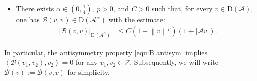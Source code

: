 \documentclass[11pt, reqno]{amsart}
\theoremstyle{definition}
\numberwithin{equation}{section}
\newcommand{\norm}[1]{\left\|{#1}\right\|}
\newcommand{\inpro}[2]{\left\langle#1,#2\right\rangle}
\newcommand{\abs}[1]{\left|{#1}\right|}
\begin{document}
\begin{itemize}
	\item[(B5)] There exists $\alpha\in (0,\frac14)$, $p>0$, and $C>0$ such that, for every $v\in \mathrm{D}(\mathcal{A})$, one has $\mathcal{B}(v,v)\in \mathrm{D}(\mathcal{A}^\alpha)$ with the estimate:
	\begin{align}
		\label{equ:V norm B}
		\abs{\mathcal{B}(v,v)}_{\mathrm{D}(\mathcal{A}^{\alpha})}
		&\leq
		C \left(1+ \norm{v}^p\right) \left(1+\abs{\mathcal{A} v}\right).
	\end{align}
\end{itemize}
In particular, the antisymmetry property \eqref{equ:B antisym} implies $\inpro{\mathcal{B}(v_1,v_2)}{v_2}=0$ for any $v_1,v_2\in \mathcal{V}$. Subsequently, we will write $\mathcal{B}(v):= \mathcal{B}(v,v)$ for simplicity.
\\
\end{document}
